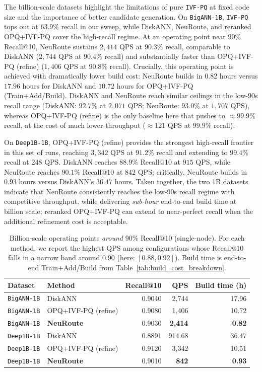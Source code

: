 \documentclass[sigconf, nonacm]{acmart}
\begin{document}
The billion-scale datasets highlight the limitations of pure \texttt{IVF-PQ} at fixed code size and the importance of better candidate generation.
On \texttt{BigANN-1B}, \texttt{IVF-PQ} tops out at $63.9\%$ recall in our sweep, while DiskANN, NeuRoute, and reranked OPQ+IVF-PQ cover the high-recall regime.
At an operating point near $90\%$ Recall@10, NeuRoute sustains $2{,}414$ QPS at $90.3\%$ recall, comparable to DiskANN ($2{,}744$ QPS at $90.4\%$ recall) and substantially faster than OPQ+IVF-PQ (refine) ($1{,}406$ QPS at $90.8\%$ recall).
Crucially, this operating point is achieved with dramatically lower build cost: NeuRoute builds in $0.82$ hours versus $17.96$ hours for DiskANN and $10.72$ hours for OPQ+IVF-PQ (Train+Add/Build).
DiskANN and NeuRoute reach similar ceilings in the low-90s recall range (DiskANN: $92.7\%$ at $2{,}071$ QPS; NeuRoute: $93.0\%$ at $1{,}707$ QPS), whereas OPQ+IVF-PQ (refine) is the only baseline here that pushes to $\approx 99.9\%$ recall, at the cost of much lower throughput ($\approx 121$ QPS at $99.9\%$ recall).

On \texttt{Deep1B-1B}, OPQ+IVF-PQ (refine) provides the strongest high-recall frontier in this set of runs, reaching $3{,}342$ QPS at $91.2\%$ recall and extending to $99.4\%$ recall at $248$ QPS.
DiskANN reaches $88.9\%$ Recall@10 at $915$ QPS, while NeuRoute reaches $90.1\%$ Recall@10 at $842$ QPS; critically, NeuRoute builds in $0.93$ hours versus DiskANN's $36.47$ hours.
Taken together, the two 1B datasets indicate that NeuRoute consistently reaches the low-90s recall regime with competitive throughput, while delivering \emph{sub-hour} end-to-end build time at billion scale; reranked OPQ+IVF-PQ can extend to near-perfect recall when the additional refinement cost is acceptable.

\begin{table}[t]
\centering
\small
\setlength{\tabcolsep}{4pt}
\renewcommand{\arraystretch}{1.05}
\caption{Billion-scale operating points \emph{around} 90\% Recall@10 (single-node).
For each method, we report the highest QPS among configurations whose Recall@10 falls in a narrow band around 0.90
(here: $[0.88, 0.92]$). Build time is end-to-end Train+Add/Build from Table~\ref{tab:build_cost_breakdown}.}
\label{tab:1b_operating_points_around90}
\begin{tabular}{l l r r r}
\toprule
Dataset & Method & Recall@10 & QPS & Build time (h) \\
\midrule
\texttt{BigANN-1B} & DiskANN & 0.9040 & 2,744 & 17.96 \\
\texttt{BigANN-1B} & OPQ+IVF-PQ (refine) & 0.9080 & 1,406 & 10.72 \\
\texttt{BigANN-1B} & \textbf{NeuRoute} & 0.9030 & \textbf{2,414} & \textbf{0.82} \\
\midrule
\texttt{Deep1B-1B} & DiskANN & 0.8891 & 914.68 & 36.47 \\
\texttt{Deep1B-1B} & OPQ+IVF-PQ (refine) & 0.9120 & 3,342 & 10.51 \\
\texttt{Deep1B-1B} & \textbf{NeuRoute} & 0.9010 & \textbf{842} & \textbf{0.93} \\
\bottomrule
\end{tabular}
\end{table}
\end{document}
